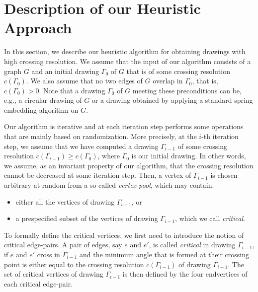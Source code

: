 \documentclass[runningheads]{llncs}
\begin{document}
\section{Description of our Heuristic Approach}
\label{sec:algorithm}

In this section, we describe our heuristic algorithm for obtaining drawings with high crossing resolution. We assume that the input of our algorithm consists of a graph $G$ and an initial drawing $\Gamma_0$ of $G$ that is of some crossing resolution $c(\Gamma_0)$. We also assume that no two edges of $G$ overlap in $\Gamma_0$, that is, $c(\Gamma_0)>0$. Note that a drawing $\Gamma_0$ of $G$ meeting these preconditions can be, e.g., a circular drawing of $G$ or a drawing obtained by applying a standard spring embedding algorithm on $G$. 

Our algorithm is iterative and at each iteration step performs some operations that are mainly based on randomization. More precisely, at the $i$-th iteration step, we assume that we have computed a drawing $\Gamma_{i-1}$ of some crossing resolution $c(\Gamma_{i-1}) \geq c(\Gamma_0)$, where $\Gamma_0$ is our initial drawing. In other words, we assume, as an invariant property of our algorithm, that the crossing resolution cannot be decreased at some iteration step. Then, a vertex of $\Gamma_{i-1}$ is chosen arbitrary at random from a so-called \emph{vertex-pool}, which may contain:

\begin{itemize}
\item either all the vertices of drawing $\Gamma_{i-1}$, or
\item a prespecified subset of the vertices of drawing $\Gamma_{i-1}$, which we call \emph{critical}.
\end{itemize}

To formally define the critical vertices, we first need to introduce the notion of critical edge-pairs. A pair of edges, say $e$ and $e'$, is called \emph{critical} in drawing $\Gamma_{i-1}$, if $e$ and $e'$ cross in $\Gamma_{i-1}$ and the minimum angle that is formed at their crossing point is either equal to the crossing resolution $c(\Gamma_{i-1})$ of drawing $\Gamma_{i-1}$. The set of critical vertices of drawing $\Gamma_{i-1}$ is then defined by the four endvertices of each critical edge-pair.  
\end{document}
